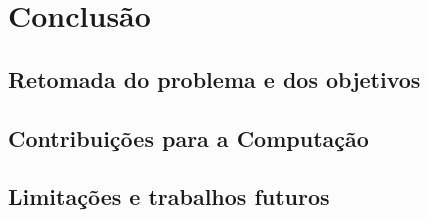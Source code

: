 \documentclass[
    12pt,                %
    openright,           %
    oneside,             %
    a4paper,             %
    english,             %
    brazil               %
]{abntex2}
\begin{document}
\chapter{Conclusão}
\label{cap:conclusao}

\section{Retomada do problema e dos objetivos}

\section{Contribuições para a Computação}

\section{Limitações e trabalhos futuros}

\postextual

%
%
%


%
%
%
\end{document}
